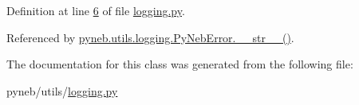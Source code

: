 Definition at line \hyperlink{logging_8py_source_l00006}{6} of file \hyperlink{logging_8py_source}{logging.\-py}.



Referenced by \hyperlink{logging_8py_source_l00007}{pyneb.\-utils.\-logging.\-Py\-Neb\-Error.\-\_\-\-\_\-str\-\_\-\-\_\-()}.



The documentation for this class was generated from the following file\-:\begin{DoxyCompactItemize}
\item 
pyneb/utils/\hyperlink{logging_8py}{logging.\-py}\end{DoxyCompactItemize}
